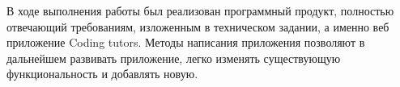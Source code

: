 \Conclusion

В ходе выполнения работы был реализован программный продукт, полностью отвечающий требованиям, изложенным в техническом задании, а именно веб приложение Coding tutors. Методы написания приложения позволяют в дальнейшем развивать приложение, легко изменять существующую функциональность и добавлять новую. 
